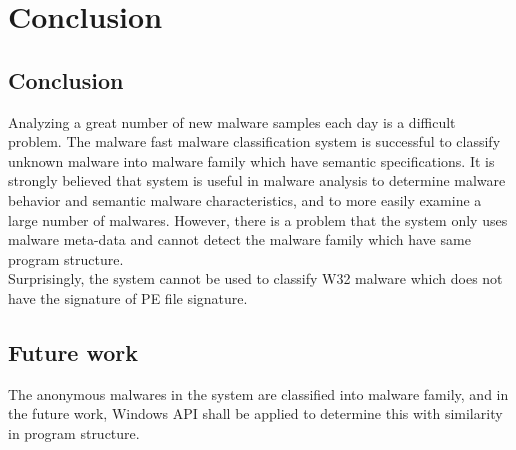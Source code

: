 

\chapter{Conclusion}\label{chap:7}
\section{Conclusion}
Analyzing a great number of new malware samples each day is a difficult problem. The malware fast malware classification system is successful to classify unknown malware into malware family which have semantic specifications. It is strongly believed that system is useful in malware analysis to determine malware behavior and semantic malware characteristics, and to more easily examine a large number of malwares.
However, there is a problem that the system only uses malware meta-data and cannot detect the malware family which have same program structure.\\
Surprisingly, the system cannot be used to classify W32 malware which does not have the signature of PE file signature. 
 
\section{Future work}
The anonymous malwares in the system are classified into malware family, and in the future work, Windows API shall be applied to determine this with similarity in program structure. 